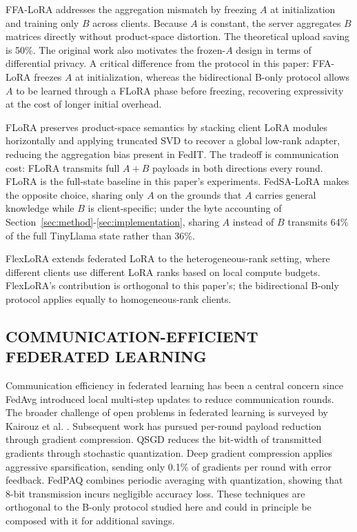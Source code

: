 FFA-LoRA \cite{sun2024ffalora} addresses the aggregation mismatch by freezing $A$ at initialization and training only $B$ across clients. Because $A$ is constant, the server aggregates $B$ matrices directly without product-space distortion. The theoretical upload saving is 50\%. The original work also motivates the frozen-$A$ design in terms of differential privacy. A critical difference from the protocol in this paper: FFA-LoRA freezes $A$ at initialization, whereas the bidirectional B-only protocol allows $A$ to be learned through a FLoRA phase before freezing, recovering expressivity at the cost of longer initial overhead.

FLoRA \cite{wang2024flora} preserves product-space semantics by stacking client LoRA modules horizontally and applying truncated SVD to recover a global low-rank adapter, reducing the aggregation bias present in FedIT. The tradeoff is communication cost: FLoRA transmits full $A{+}B$ payloads in both directions every round. FLoRA is the full-state baseline in this paper's experiments. FedSA-LoRA \cite{guo2025fedsalora} makes the opposite choice, sharing only $A$ on the grounds that $A$ carries general knowledge while $B$ is client-specific; under the byte accounting of Section~\ref{sec:method}-\ref{sec:implementation}, sharing $A$ instead of $B$ transmits 64\% of the full TinyLlama state rather than 36\%.

FlexLoRA \cite{bai2024flexlora} extends federated LoRA to the heterogeneous-rank setting, where different clients use different LoRA ranks based on local compute budgets. FlexLoRA's contribution is orthogonal to this paper's; the bidirectional B-only protocol applies equally to homogeneous-rank clients.

\subsection{COMMUNICATION-EFFICIENT FEDERATED LEARNING}
Communication efficiency in federated learning has been a central concern since FedAvg \cite{mcmahan2017communication} introduced local multi-step updates to reduce communication rounds. The broader challenge of open problems in federated learning is surveyed by Kairouz et al. \cite{kairouz2021advances}. Subsequent work has pursued per-round payload reduction through gradient compression. QSGD \cite{alistarh2017qsgd} reduces the bit-width of transmitted gradients through stochastic quantization. Deep gradient compression \cite{lin2017deep} applies aggressive sparsification, sending only 0.1\% of gradients per round with error feedback. FedPAQ \cite{reisizadeh2020fedpaq} combines periodic averaging with quantization, showing that 8-bit transmission incurs negligible accuracy loss. These techniques are orthogonal to the B-only protocol studied here and could in principle be composed with it for additional savings.

